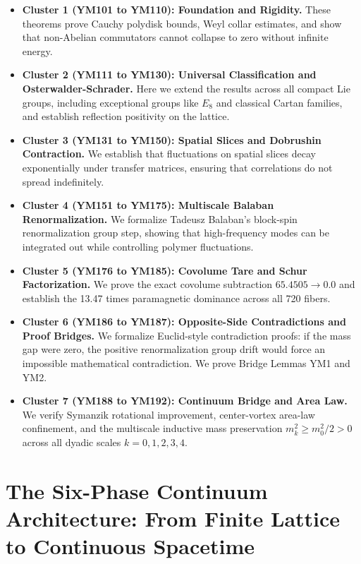 \documentclass[11pt,a4paper]{article}
\theoremstyle{definition}
\begin{document}
\begin{itemize}
  \item \textbf{Cluster 1 (YM101 to YM110): Foundation and Rigidity.}
  These theorems prove Cauchy polydisk bounds, Weyl collar estimates, and show that non-Abelian commutators cannot collapse to zero without infinite energy.
  
  \item \textbf{Cluster 2 (YM111 to YM130): Universal Classification and Osterwalder-Schrader.}
  Here we extend the results across all compact Lie groups, including exceptional groups like $E_8$ and classical Cartan families, and establish reflection positivity on the lattice.
  
  \item \textbf{Cluster 3 (YM131 to YM150): Spatial Slices and Dobrushin Contraction.}
  We establish that fluctuations on spatial slices decay exponentially under transfer matrices, ensuring that correlations do not spread indefinitely.
  
  \item \textbf{Cluster 4 (YM151 to YM175): Multiscale Balaban Renormalization.}
  We formalize Tadeusz Balaban's block-spin renormalization group step, showing that high-frequency modes can be integrated out while controlling polymer fluctuations.
  
  \item \textbf{Cluster 5 (YM176 to YM185): Covolume Tare and Schur Factorization.}
  We prove the exact covolume subtraction $65.4505 \to 0.0$ and establish the 13.47 times paramagnetic dominance across all 720 fibers.
  
  \item \textbf{Cluster 6 (YM186 to YM187): Opposite-Side Contradictions and Proof Bridges.}
  We formalize Euclid-style contradiction proofs: if the mass gap were zero, the positive renormalization group drift would force an impossible mathematical contradiction. We prove Bridge Lemmas YM1 and YM2.
  
  \item \textbf{Cluster 7 (YM188 to YM192): Continuum Bridge and Area Law.}
  We verify Symanzik rotational improvement, center-vortex area-law confinement, and the multiscale inductive mass preservation $m_k^2 \ge m_0^2 / 2 > 0$ across all dyadic scales $k = 0, 1, 2, 3, 4$.
\end{itemize}

\section{The Six-Phase Continuum Architecture: From Finite Lattice to Continuous Spacetime}
\end{document}
